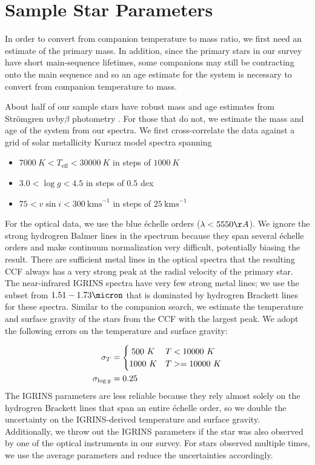 \documentclass{emulateapj}
\begin{document}
\section{Sample Star Parameters}
\label{sec:sp}

In order to convert from companion temperature to mass ratio, we first need an estimate of the primary mass. In addition, since the primary stars in our survey have short main-sequence lifetimes, some companions may still be contracting onto the main sequence and so an age estimate for the system is necessary to convert from companion temperature to mass.

About half of our sample stars have robust mass and age estimates from Str\"omgren uvby$\beta$ photometry \citep{David2015}. For those that do not, we estimate the mass and age of the system from our spectra. We first cross-correlate the data against a grid of solar metallicity Kurucz model spectra \citep{Castelli2003} spanning

\begin{itemize}
\item $7000\ K < T_\mathrm{eff} < 30000\ K$ in steps of $1000\ K$
\item $3.0 < \log{g} < 4.5$ in steps of $0.5$ dex
\item $75 < v\sin{i} < 300\ \mathrm{km s}^{-1}$ in steps of $25\ \mathrm{km s}^{-1}$
\end{itemize}


For the optical data, we use the blue \'echelle orders ($\lambda < 5550 \AA$). We ignore the strong hydrogren Balmer lines in the spectrum because they span several \'echelle orders and make continuum normalization very difficult, potentially biasing the result. There are sufficient metal lines in the optical spectra that the resulting CCF always has a very strong peak at the radial velocity of the primary star. The near-infrared IGRINS spectra have very few strong metal lines; we use the subset from $1.51 - 1.73 \micron$ that is dominated by hydrogren Brackett lines for these spectra. Similar to the companion search, we estimate the temperature and surface gravity of the stars from the CCF with the largest peak. We adopt the following errors on the temperature and surface gravity:

\begin{align}
 \sigma_T &= \begin{cases}
      \hfill 500\ K \hfill & T < 10000\ K \\
      \hfill 1000\ K \hfill & T >= 10000\ K \\
     \end{cases} \\
 \sigma_{\log{g}} &= 0.25
\end{align}
The IGRINS parameters are less reliable because they rely almost solely on the hydrogren Brackett lines that span an entire \'echelle order, so we double the uncertainty on the IGRINS-derived temperature and surface gravity. Additionally, we throw out the IGRINS parameters if the star was also observed by one of the optical instruments in our survey. For stars observed multiple times, we use the average parameters and reduce the uncertainties accordingly.
\end{document}
